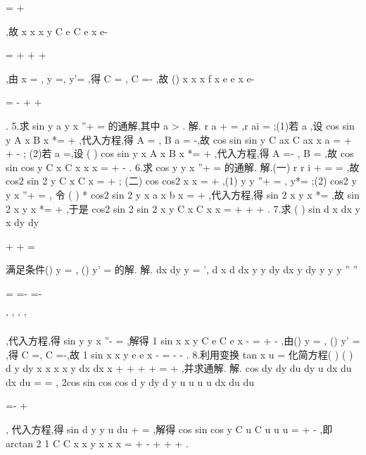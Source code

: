 =
+




,故
x
x
x
y
C e
C e
x
e-


=
+
+
+




,由
x =
,
y =,
y'=
,得 
C =
,
C =-
,故
()
x
x
x
f x
e
e
x
e-


=
-
+
+




. 
5.求
sin
y
a y
x
''+
=
的通解,其中
a >
. 
解.
r
a
+
=
,r
ai
=\pm 
;(1)若
a \neq ,设
cos
sin
y
A
x
B
x
*=
+
,代入方程,得 
A =
,
B
a
=
-,故
cos
sin
sin
y
C
ax
C
ax
x
a
=
+
+
-
; 
(2)若
a =,设
(
)
cos
sin
y
x A
x
B
x
*=
+
,代入方程,得
A =-
,
B =
,故 
cos
sin
cos
y
C
x
C
x
x
x
=
+
-
. 
6.求
cos
y
y
x
''+
=
的通解. 
解.(一)
r
r
i
+
=
\Rightarrow 
=\pm 
,故
cos2
sin 2
y
C
x
C
x
=
+
; 
(二)
cos
cos2
x
x
=
+
,(1)
y
y
''+
=
,
y*=
;(2)
cos2
y
y
x
''+
=
, 
令
(
)
*
cos2
sin 2
y
x a
x
b
x
=
+
,代入方程,得
sin 2
x
y
x
*=
,故 
sin 2
x
y
x
*=
+
,于是
cos2
sin 2
sin 2
x
y
C
x
C
x
x
=
+
+
+
. 
7.求
(
)
sin
d x
dx
y
x
dy
dy


+
+
=




满足条件()
y
=
,
()
y'
=
的解. 
解.
dx
dy
y
=
',
d x
d
dx
y
y
dy
dx
y
dy
y
y
y
''
''


=
=-
=-

'
'
'
'


,代入方程,得 
sin
y
y
x
''-
=
,解得
1 sin
x
x
y
C e
C e
x
-
=
+
-
,由()
y
=
,
()
y'
=
,得 
C =,
C =-,故
1 sin
x
x
y
e
e
x
-
=
-
-
. 
8.利用变换
tan
x
u
=
化简方程(
)
(
)
d y
dy
x
x
x
x
y
dx
dx
x
+
+
+
+
=
+
,并求通解. 
解.
cos
dy
dy du
dy
u
dx
du dx
du
=
=
\cdots 
,
2cos sin
cos
cos
d y
dy
d y
u
u
u
u
dx
du
du


=-
\cdots 
+
\cdots 




, 
代入方程,得
sin
d y
y
u
du +
=
,解得
cos
sin
cos
y
C
u
C
u
u
u
=
+
-
,即 
arctan
2 1
C
C x
x
y
x
x
x
=
+
-
+
+
+
. 